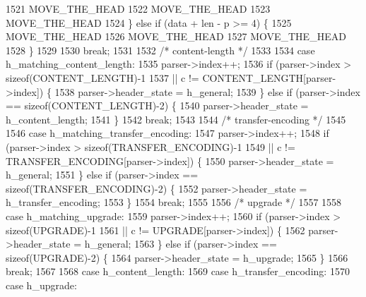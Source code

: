 \begin{DoxyCode}
1521                 MOVE_THE_HEAD
1522                 MOVE_THE_HEAD
1523                 MOVE_THE_HEAD
1524               \} \textcolor{keywordflow}{else} \textcolor{keywordflow}{if} (data + len - p >= 4) \{
1525                 MOVE_THE_HEAD
1526                 MOVE_THE_HEAD
1527                 MOVE_THE_HEAD
1528               \}
1529 
1530               \textcolor{keywordflow}{break};
1531 
1532             \textcolor{comment}{/* content-length */}
1533 
1534             \textcolor{keywordflow}{case} h_matching_content_length:
1535               parser->index++;
1536               \textcolor{keywordflow}{if} (parser->index > \textcolor{keyword}{sizeof}(CONTENT_LENGTH)-1
1537                   || c != CONTENT_LENGTH[parser->index]) \{
1538                 parser->header_state = h_general;
1539               \} \textcolor{keywordflow}{else} \textcolor{keywordflow}{if} (parser->index == \textcolor{keyword}{sizeof}(CONTENT_LENGTH)-2) \{
1540                 parser->header_state = h_content_length;
1541               \}
1542               \textcolor{keywordflow}{break};
1543 
1544             \textcolor{comment}{/* transfer-encoding */}
1545 
1546             \textcolor{keywordflow}{case} h_matching_transfer_encoding:
1547               parser->index++;
1548               \textcolor{keywordflow}{if} (parser->index > \textcolor{keyword}{sizeof}(TRANSFER_ENCODING)-1
1549                   || c != TRANSFER_ENCODING[parser->index]) \{
1550                 parser->header_state = h_general;
1551               \} \textcolor{keywordflow}{else} \textcolor{keywordflow}{if} (parser->index == \textcolor{keyword}{sizeof}(TRANSFER_ENCODING)-2) \{
1552                 parser->header_state = h_transfer_encoding;
1553               \}
1554               \textcolor{keywordflow}{break};
1555 
1556             \textcolor{comment}{/* upgrade */}
1557 
1558             \textcolor{keywordflow}{case} h_matching_upgrade:
1559               parser->index++;
1560               \textcolor{keywordflow}{if} (parser->index > \textcolor{keyword}{sizeof}(UPGRADE)-1
1561                   || c != UPGRADE[parser->index]) \{
1562                 parser->header_state = h_general;
1563               \} \textcolor{keywordflow}{else} \textcolor{keywordflow}{if} (parser->index == \textcolor{keyword}{sizeof}(UPGRADE)-2) \{
1564                 parser->header_state = h_upgrade;
1565               \}
1566               \textcolor{keywordflow}{break};
1567 
1568             \textcolor{keywordflow}{case} h_content_length:
1569             \textcolor{keywordflow}{case} h_transfer_encoding:
1570             \textcolor{keywordflow}{case} h_upgrade:

\end{DoxyCode}
